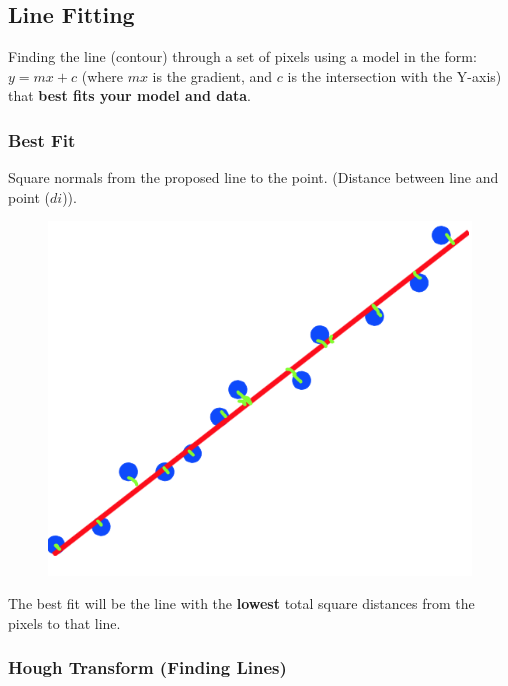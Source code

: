 \documentclass[english, 10pt]{article}
\begin{document}
\subsection{Line Fitting}

  Finding the line (contour) through a set of pixels using a model in the form: $y = mx + c$ (where $mx$ is the gradient, and $c$ is the intersection with the Y-axis) that \textbf{best fits your model and data}.

\subsubsection{Best Fit}

    Square normals from the proposed line to the point. (Distance
    between line and point ($di$)). 
    
        \begin{figure}[ht!]      
	\centering 
	\includegraphics[scale=0.3]{best_fit.png}
\end{figure}

    The best fit will be the line with the \textbf{lowest} total square
    distances from the pixels to that line.
    
\subsubsection{Hough Transform (Finding
Lines)}\label{hough-transform-finding-lines}
\end{document}
